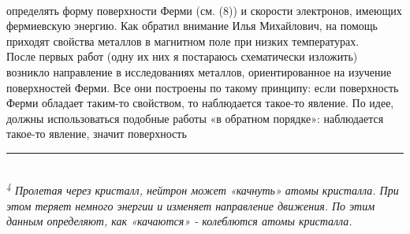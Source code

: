 \begin{paracol}{2}
\begin{multicols}{2}
        \columnbreak
        \\
        {\fontsize{8}{10}\selectfont определять форму поверхности Ферми (см. (8)) и скорости электронов, имеющих фермиевскую энергию. Как обратил внимание Илья Михайлович, на помощь приходят свойства металлов в магнитном поле при низких температурах. \\
        После первых работ (одну их них я постараюсь схематически изложить) возникло направление в исследованиях металлов, ориентированное на изучение поверхностей Ферми. Все они построены по такому принципу: если поверхность Ферми обладает таким-то свойством, то наблюдается такое-то явление. По идее, должны использоваться подобные работы «в обратном порядке»: наблюдается такое-то явление, значит поверхность}
        \rule{2.5cm}{0.4pt} \\
        {\fontsize{6}{8}\selectfont \sl \textsuperscript{4} Пролетая через кристалл, нейтрон может «качнуть» атомы кристалла. При этом теряет немного энергии и изменяет направление движения. По этим данным определяют, как «качаются» - колеблются атомы кристалла.}
        \end{multicols}
    \end{paracol}
